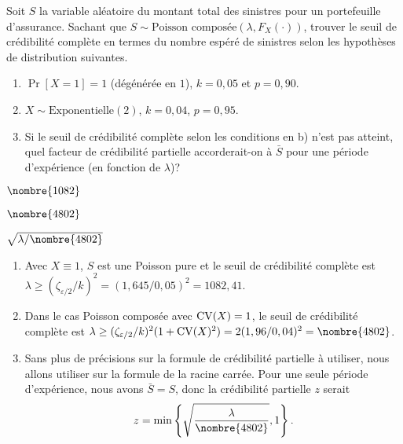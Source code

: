 \begin{exercice}
  Soit $S$ la variable aléatoire du montant total des sinistres pour
  un portefeuille d'assurance. Sachant que $S \sim \text{Poisson
    composée}(\lambda, F_X(\cdot))$, trouver le seuil de crédibilité
  complète en termes du nombre espéré de sinistres selon les
  hypothèses de distribution suivantes.
  \begin{enumerate}
  \item $\Pr[X = 1] = 1$ (dégénérée en $1$), $k = 0,05$ et $p = 0,90$.
  \item $X \sim \text{Exponentielle}(2)$, $k = 0,04$, $p = 0,95$.
  \item Si le seuil de crédibilité complète selon les conditions en b)
    n'est pas atteint, quel facteur de crédibilité partielle
    accorderait-on à $\bar{S}$ pour une période d'expérience (en
    fonction de $\lambda$)?
  \end{enumerate}
  \begin{rep}
    \begin{inparaenum}
    \item $\nombre{1082}$
    \item $\nombre{4802}$
    \item $\sqrt{\lambda/\nombre{4802}}$
    \end{inparaenum}
  \end{rep}
  \begin{sol}
    \begin{enumerate}
    \item Avec $X \equiv 1$, $S$ est une Poisson pure et le seuil de
      crédibilité complète est $\lambda \geq
      (\zeta_{\varepsilon/2}/k)^2 = (1,645/0,05)^2 = 1082,41$.
    \item Dans le cas Poisson composée avec $\operatorname{CV}(X) = 1$, le
      seuil de crédibilité complète est $\lambda \geq
      (\zeta_{\varepsilon/2}/k)^2 (1 + \CV(X)^2) = 2
      (1,96/0,04)^2 = \nombre{4802}$.
    \item Sans plus de précisions sur la formule de crédibilité
      partielle à utiliser, nous allons utiliser sur la formule de la
      racine carrée. Pour une seule période d'expérience, nous avons
      $\bar{S} = S$, donc la crédibilité partielle $z$ serait
      \begin{displaymath}
        z = \min
        \left\{
          \sqrt{\frac{\lambda}{\nombre{4802}}}, 1
        \right\}.
      \end{displaymath}
    \end{enumerate}
  \end{sol}
\end{exercice}

